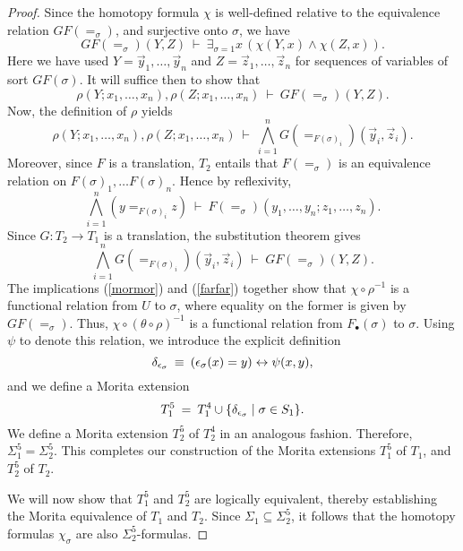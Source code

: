 \begin{proof}
Since the homotopy formula $\chi$ is well-defined relative to the
equivalence relation $GF(=_\sigma )$, and surjective onto $\sigma$, we
have
\[ GF(=_\sigma )(Y,Z)\:\vdash \:\exists _{\sigma =1} x \,(\chi (Y,x)\wedge
  \chi (Z,x)) . \] Here we have used $Y=\vec{y}_1,\dots ,\vec{y}_n$
and $Z=\vec{z}_1,\dots ,\vec{z}_n$ for sequences of variables of sort
$GF(\sigma )$.  It will suffice then to show that
\begin{equation} \rho (Y;x_1,\dots ,x_n),\rho (Z;x_1,\dots ,x_n) \: \vdash \:
  GF(=_\sigma )(Y,Z) . \label{ian} \end{equation}
Now, the definition of $\rho$ yields 
\begin{equation} \rho (Y;x_1,\dots ,x_n),\rho (Z;x_1,\dots ,x_n) \:
  \vdash \: \bigwedge _{i=1}^nG(=_{F(\sigma )_i})(\vec{y}_i,\vec{z}_i)
  . \label{mormor} \end{equation} Moreover, since $F$ is a
translation, $T_2$ entails that $F(= _\sigma )$ is an equivalence
relation on $F(\sigma )_1,\dots F(\sigma )_n$.  Hence by reflexivity,
  \[ \bigwedge _{i=1}^n(y=_{F(\sigma )_i}z) \: \vdash \: F(=_\sigma
    )(y_1,\dots ,y_n;z_1,\dots ,z_n) .\] Since $G:T_2\to T_1$ is a
  translation, the substitution theorem gives
  \begin{equation} \bigwedge _{i=1}^n G(=_{F(\sigma
      )_i})(\vec{y}_i,\vec{z}_i) \:\vdash \: GF(=_\sigma )(Y,Z)
    . \label{farfar} \end{equation} The implications (\ref{mormor})
  and (\ref{farfar}) together show that $\chi\circ\rho ^{-1}$ is a
  functional relation from $U$ to $\sigma$, where equality on the
  former is given by $GF(=_\sigma )$.  Thus,
  $\chi\circ (\theta\circ\rho )^{-1}$ is a functional relation from
  $F_\bullet (\sigma )$ to $\sigma$.  Using $\psi$ to denote this
  relation, we introduce the explicit definition
\begin{equation} \delta _{\epsilon _\sigma }\: \equiv \: (\epsilon _\sigma
  (x)=y)\leftrightarrow \psi (x,y) ,\label{ex2} \end{equation} and we define a
Morita extension
\[ T_1^5 \: =\: T_1^4\cup \{ \delta _{\epsilon _\sigma}\mid \sigma \in S _1
  \} .\] We define a Morita extension $T_2^5$ of $T_2^4$ in an
analogous fashion.  Therefore, $\Sigma _1^5=\Sigma _2^5$.  This
completes our construction of the Morita extensions $T_1^5$ of $T_1$,
and $T_2^5$ of $T_2$.

\bigskip We will now show that $T_1^5$ and $T_2^5$ are logically
equivalent, thereby establishing the Morita equivalence of $T_1$ and
$T_2$.  Since $\Sigma _1\subseteq \Sigma _2^5$, it follows that the
homotopy formulas $\chi _\sigma$ are also $\Sigma _2^5$-formulas.


\end{proof}
